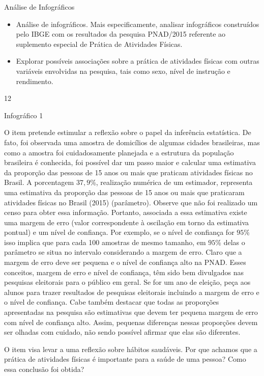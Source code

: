 \begin{objectives}{Análise de Infográficos}
{
\begin{itemize}
\item Análise de infográficos. Mais especificamente, analisar infográficos construídos pelo IBGE com os resultados da pesquisa PNAD/2015 referente ao suplemento especial de Prática de Atividades Físicas.

\item Explorar possíveis associações sobre a prática de atividades físicas com outras variáveis envolvidas na pesquisa, tais como sexo, nível de instrução e rendimento.
\end{itemize}
}{1}{2}
\end{objectives}
\clearmargin
\begin{sugestions}{Infográfico 1}
{
O item  pretende estimular a reflexão sobre o papel da inferência estatística. De fato, foi observada uma amostra de domicílios de algumas cidades brasileiras, mas como a amostra foi cuidadosamente planejada e a estrutura da população brasileira é conhecida, foi possível dar um passo maior e calcular uma estimativa da proporção das pessoas de 15 anos ou mais que praticam atividades físicas no Brasil. A porcentagem $37{,}9$\%, realização numérica de um estimador, representa uma estimativa da proporção das pessoas de 15 anos ou mais que praticaram atividades físicas no Brasil (2015) (parâmetro). Observe que não foi realizado um censo para obter essa informação. Portanto, associada a essa estimativa existe uma margem de erro (valor correspondente à oscilação em torno da estimativa pontual) e um nível de confiança. Por exemplo, se o nível de confiança for $95$\% isso implica que para cada 100 amostras de mesmo tamanho, em $95$\% delas o parâmetro se situa no intervalo considerando a margem de erro. Claro que a margem de erro deve ser pequena e o nível de confiança alto na PNAD. Esses conceitos, margem de erro e nível de confiança, têm sido bem divulgados nas pesquisas eleitorais para o público em geral. Se for um ano de eleição, peça aos alunos para trazer resultados de pesquisas eleitorais incluindo a margem de erro e o nível de confiança. Cabe também destacar que todas as proporções apresentadas na pesquisa são estimativas que devem ter pequena margem de erro com nível de confiança alto. Assim, pequenas diferenças nessas proporções devem ser olhadas com cuidado, não sendo possível afirmar que elas são diferentes.

O item  visa levar a uma reflexão sobre hábitos saudáveis. Por que achamos que a prática de atividades físicas é importante para a saúde de uma pessoa? Como essa conclusão foi obtida?

}
\end{sugestions}
